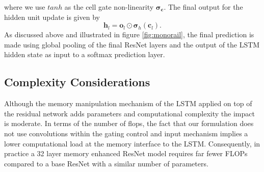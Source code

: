 \documentclass{article}
\begin{document}
%
where we use \(tanh\) as the cell gate non-linearity \(\boldsymbol{\sigma_{c}}\). The final output for the hidden unit update is given by
%
\begin{equation}
\boldsymbol{h}_l = \boldsymbol{o}_l \odot \boldsymbol{\sigma}_h(\boldsymbol{c}_l).
\end{equation}
%
As discussed above and illustrated in figure \ref{fig:monorail}, the final prediction is made using global pooling of the final ResNet layers and the output of the LSTM hidden state as input to a softmax prediction layer.
%
%
%
%
%
\subsection{Complexity Considerations}

Although the memory manipulation mechanism of the LSTM applied on top of the residual network adds parameters and computational complexity the impact is moderate.
In terms of the number of flops, the fact that our formulation does not use convolutions within the gating control and input mechanism implies a lower computational load at the memory interface to the LSTM. Consequently, in practice a 32 layer memory enhanced ResNet model requires far fewer FLOPs compared to a base ResNet with a similar number of parameters.
%
%
\end{document}
